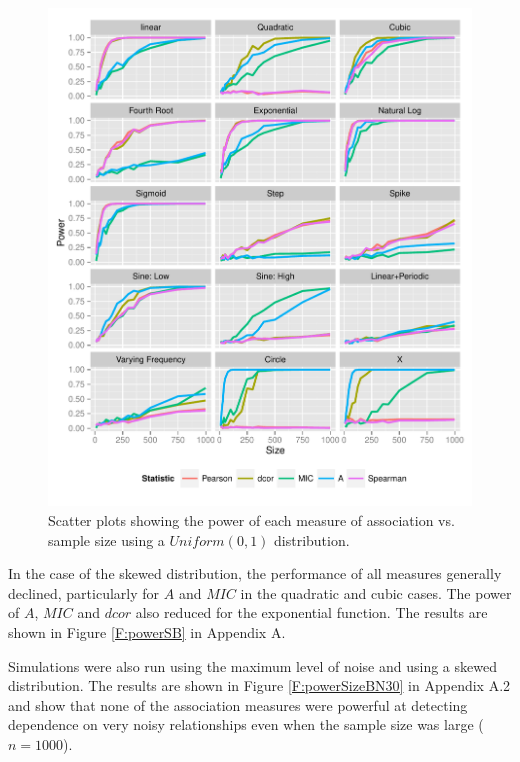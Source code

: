 \documentclass[a4paper, 12pt]{report}
\begin{document}
\begin{figure}[H]
\begin{center}
\includegraphics[width=\textwidth]{powerSizeUN10.pdf}
\caption{Scatter plots showing the power of each measure of association vs. sample size using a $Uniform(0,1)$ distribution.} 
\label{F:powerSizeUN10}
\end{center}
\end{figure}

In the case of the skewed distribution, the performance of all measures generally declined, particularly for $A$ and $MIC$ in the quadratic and cubic cases. The power of $A$, $MIC$ and $dcor$ also reduced for the exponential function. The results are shown in Figure \ref{F:powerSB} in Appendix A.

Simulations were also run using the maximum level of noise and using a skewed distribution. The results are shown in Figure \ref{F:powerSizeBN30} in Appendix A.2 and show that none of the association measures were powerful at detecting dependence on very noisy relationships even when the sample size was large ($n=1000$).


\end{document}
